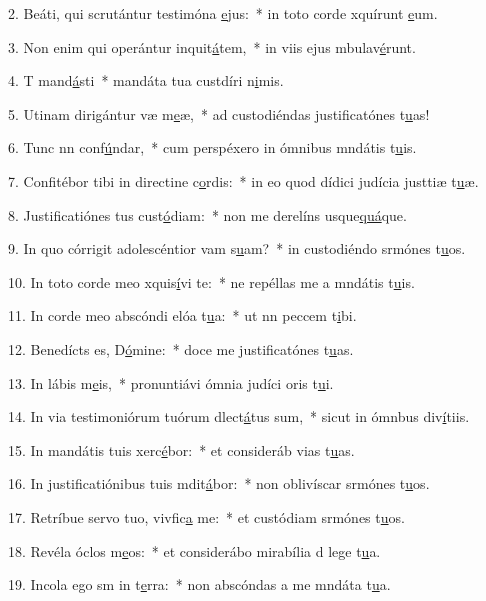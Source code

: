 2. Beáti, qui scrutántur testimóna \uline{e}jus:~* in toto corde xquírunt \uline{e}um.\par 
3. Non enim qui operántur inquit\uline{á}tem,~* in viis ejus mbulav\uline{é}runt.\par 
4. T mand\uline{á}sti~* mandáta tua custdíri n\uline{i}mis.\par 
5. Utinam dirigántur væ m\uline{e}æ,~* ad custodiéndas justificatónes t\uline{u}as!\par 
6. Tunc nn conf\uline{ú}ndar,~* cum perspéxero in ómnibus mndátis t\uline{u}is.\par 
7. Confitébor tibi in directine c\uline{o}rdis:~* in eo quod dídici judícia justtiæ t\uline{u}æ.\par 
8. Justificatiónes tus cust\uline{ó}diam:~* non me derelíns usque\uline{quá}que.\par 
9. In quo córrigit adolescéntior vam s\uline{u}am?~* in custodiéndo srmónes t\uline{u}os.\par 
10. In toto corde meo xquis\uline{í}vi te:~* ne repéllas me a mndátis t\uline{u}is.\par 
11. In corde meo abscóndi elóa t\uline{u}a:~* ut nn peccem t\uline{i}bi.\par 
12. Benedícts es, D\uline{ó}mine:~* doce me justificatónes t\uline{u}as.\par 
13. In lábis m\uline{e}is,~* pronuntiávi ómnia judíci oris t\uline{u}i.\par 
14. In via testimoniórum tuórum dlect\uline{á}tus sum,~* sicut in ómnbus div\uline{í}tiis.\par 
15. In mandátis tuis xerc\uline{é}bor:~* et consideráb vias t\uline{u}as.\par 
16. In justificatiónibus tuis mdit\uline{á}bor:~* non oblivíscar srmónes t\uline{u}os.\par 
17. Retríbue servo tuo, vivfic\uline{a} me:~* et custódiam srmónes t\uline{u}os.\par 
18. Revéla óclos m\uline{e}os:~* et considerábo mirabília d lege t\uline{u}a.\par 
19. Incola ego sm in t\uline{e}rra:~* non abscóndas a me mndáta t\uline{u}a.\par 
